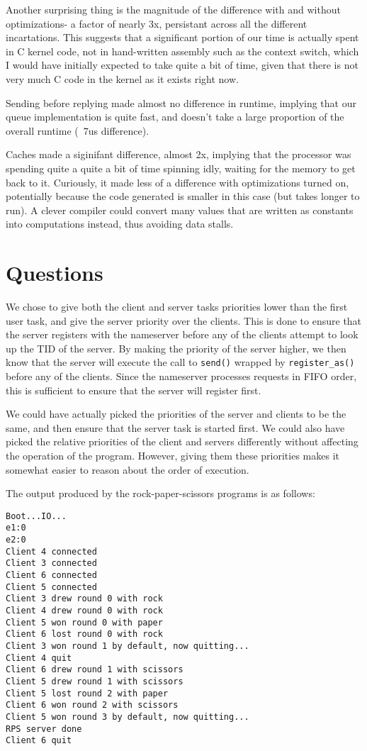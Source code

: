 \documentclass[titlepage]{article}
\begin{document}
Another surprising thing is the magnitude of the difference with and without
optimizations- a factor of nearly 3x, persistant across all the different
incartations. This suggests that a significant portion of our time is actually
spent in C kernel code, not in hand-written assembly such as the context switch,
which I would have initially expected to take quite a bit of time, given that
there is not very much C code in the kernel as it exists right now.

Sending before replying made almost no difference in runtime, implying that our queue
implementation is quite fast, and doesn't take a large proportion of the overall
runtime (~7us difference).

Caches made a siginifant difference, almost 2x, implying that the processor was
spending quite a quite a bit of time spinning idly, waiting for the memory to
get back to it. Curiously, it made less of a difference with optimizations
turned on, potentially because the code generated is smaller in this case (but
takes longer to run). A clever compiler could convert many values that are
written as constants into computations instead, thus avoiding data stalls.

\section{Questions}
We chose to give both the client and server tasks priorities lower than
the first user task, and give the server priority over the clients.
This is done to ensure that the server registers with the nameserver before
any of the clients attempt to look up the TID of the server.
By making the priority of the server higher, we then know that the server will
execute the call to \texttt{send()} wrapped by \texttt{register\_as()} before
any of the clients.
Since the nameserver processes requests in FIFO order, this is sufficient to
ensure that the server will register first.

We could have actually picked the priorities of the server and clients to be the
same, and then ensure that the server task is started first.
We could also have picked the relative priorities of the client and servers differently
without affecting the operation of the program.
However, giving them these priorities makes it somewhat easier to reason about
the order of execution.

The output produced by the rock-paper-scissors programs is as follows:

\begin{verbatim}
Boot...IO...
e1:0
e2:0
Client 4 connected
Client 3 connected
Client 6 connected
Client 5 connected
Client 3 drew round 0 with rock
Client 4 drew round 0 with rock
Client 5 won round 0 with paper
Client 6 lost round 0 with rock
Client 3 won round 1 by default, now quitting...
Client 4 quit
Client 6 drew round 1 with scissors
Client 5 drew round 1 with scissors
Client 5 lost round 2 with paper
Client 6 won round 2 with scissors
Client 5 won round 3 by default, now quitting...
RPS server done
Client 6 quit
\end{verbatim}
\end{document}
